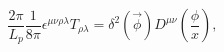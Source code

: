 \begin{equation}
\frac{2\pi }{L_p}\frac 1{8\pi }\epsilon ^{\mu \nu \rho \lambda }T_{\rho
\lambda }=\delta ^2(\vec{\phi})D^{\mu \nu }(\frac \phi x),  \label{deltav}
\end{equation}

